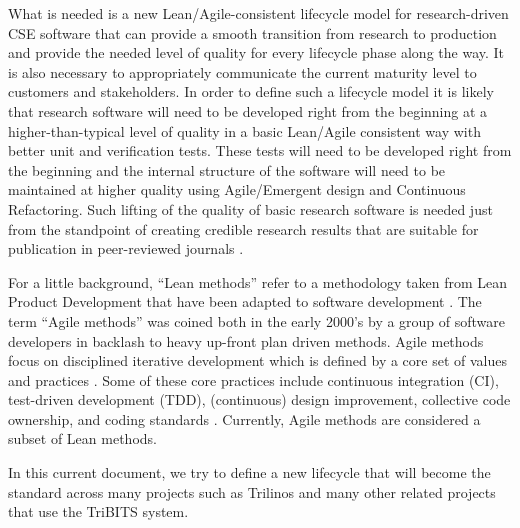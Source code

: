 \documentclass[11pt]{SANDreport}
\begin{document}
What is needed is a new Lean/Agile-consistent lifecycle model for
research-driven CSE software that can provide a smooth transition from
research to production and provide the needed level of quality for
every lifecycle phase along the way.  It is also necessary to
appropriately communicate the current maturity level to customers and
stakeholders.  In order to define such a lifecycle model it is likely
that research software will need to be developed right from the
beginning at a higher-than-typical level of quality in a basic
Lean/Agile consistent way with better unit and verification tests.
These tests will need to be developed right from the beginning and the
internal structure of the software will need to be maintained at
higher quality using Agile/Emergent design and Continuous Refactoring.
Such lifting of the quality of basic research software is needed just
from the standpoint of creating credible research results that are
suitable for publication in peer-reviewed journals
{}\cite{CompSciDemandsNewParadigm05,
ScientistsNightmareFiveRetractions2006}.

For a little background, ``Lean methods'' refer to a methodology taken
from Lean Product Development that have been adapted to software
development {}\cite{ImplementingLeanSoftwareDevelopment}.  The term
``Agile methods'' was coined both in the early 2000's by a group of
software developers in backlash to heavy up-front plan driven methods.
Agile methods focus on disciplined iterative development which is
defined by a core set of values and practices
{}\cite{AgileSoftwareDevelopment, Scrum, XP2}.  Some of these core
practices include continuous integration (CI), test-driven
development (TDD), (continuous) design improvement, collective code
ownership, and coding standards {}\cite{AgileSoftwareDevelopment,
XP2}.  Currently, Agile methods are considered a subset of Lean
methods.

In this current document, we try to define a new lifecycle that will
become the standard across many projects such as Trilinos and many
other related projects that use the TriBITS system.
\end{document}
